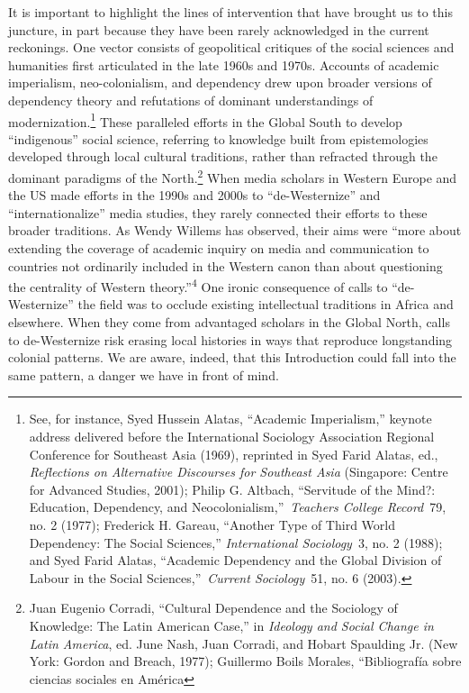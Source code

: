 \documentclass{tufte-handout}
\begin{document}
It is important to highlight the lines of intervention that have brought
us to this juncture, in part because they have been rarely acknowledged
in the current reckonings. One vector consists of geopolitical critiques
of the social sciences and humanities first articulated in the late
1960s and 1970s. Accounts of academic imperialism, neo-colonialism, and
dependency drew upon broader versions of dependency theory and
refutations of dominant understandings of modernization.\footnote{See,
  for instance, Syed Hussein Alatas, ``Academic Imperialism,'' keynote
  address delivered before the International Sociology Association
  Regional Conference for Southeast Asia (1969), reprinted in Syed Farid
  Alatas, ed., \emph{Reflections on Alternative Discourses for Southeast
  Asia} (Singapore: Centre for Advanced Studies, 2001); Philip G.
  Altbach, ``Servitude of the Mind?: Education, Dependency, and
  Neocolonialism,''~\emph{Teachers College Record}~79, no. 2 (1977);
  Frederick H. Gareau, ``Another Type of Third World Dependency: The
  Social Sciences,'' \emph{International Sociology}~3, no. 2 (1988); and
  Syed Farid Alatas, ``Academic Dependency and the Global Division of
  Labour in the Social Sciences,''~\emph{Current Sociology}~51, no. 6
  (2003).} These paralleled efforts in the Global South to develop
``indigenous'' social science, referring to knowledge built from
epistemologies developed through local cultural traditions, rather than
refracted through the dominant paradigms of the North.\footnote{Juan
  Eugenio Corradi, ``Cultural Dependence and the Sociology of Knowledge:
  The Latin American Case,'' in \emph{Ideology and Social Change in
  Latin America}, ed. June Nash, Juan Corradi, and Hobart Spaulding Jr.
  (New York: Gordon and Breach, 1977); Guillermo Boils Morales,
  ``Bibliografía sobre ciencias sociales en América} When
media scholars in Western Europe and the US made efforts in the 1990s
and 2000s to ``de-Westernize'' and ``internationalize'' media studies,
they rarely connected their efforts to these broader traditions. As
Wendy Willems has observed, their aims were ``more about extending the
coverage of academic inquiry on media and communication to countries not
ordinarily included in the Western canon than about questioning the
centrality of Western theory.''\textsuperscript{4} One ironic
consequence of calls to ``de-Westernize'' the field was to occlude
existing intellectual traditions in Africa and elsewhere. When they come
from advantaged scholars in the Global North, calls to de-Westernize
risk erasing local histories in ways that reproduce longstanding
colonial patterns. We are aware, indeed, that this Introduction could
fall into the same pattern, a danger we have in front of mind.
\end{document}
